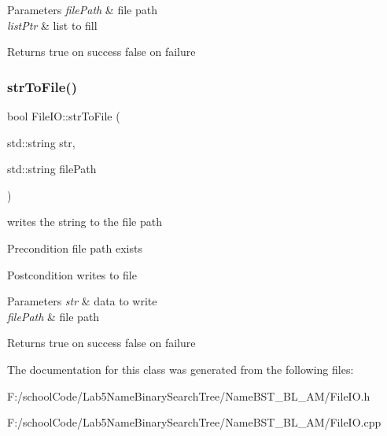 \begin{DoxyParams}{Parameters}
{\em file\+Path} & file path \\
\hline
{\em list\+Ptr} & list to fill \\
\hline
\end{DoxyParams}
\begin{DoxyReturn}{Returns}
true on success false on failure 
\end{DoxyReturn}
\mbox{\label{class_file_i_o_ac3a2546c33e52aab6f4b9376d5c41d5e}} 
\subsubsection{\texorpdfstring{str\+To\+File()}{strToFile()}}
{\footnotesize\ttfamily bool File\+I\+O\+::str\+To\+File (\begin{DoxyParamCaption}\item[{std\+::string}]{str,  }\item[{std\+::string}]{file\+Path }\end{DoxyParamCaption})\hspace{0.3cm}{\ttfamily [static]}}

writes the string to the file path \begin{DoxyPrecond}{Precondition}
file path exists 
\end{DoxyPrecond}
\begin{DoxyPostcond}{Postcondition}
writes to file 
\end{DoxyPostcond}

\begin{DoxyParams}{Parameters}
{\em str} & data to write \\
\hline
{\em file\+Path} & file path \\
\hline
\end{DoxyParams}
\begin{DoxyReturn}{Returns}
true on success false on failure 
\end{DoxyReturn}


The documentation for this class was generated from the following files\+:\begin{DoxyCompactItemize}
\item 
F\+:/school\+Code/\+Lab5\+Name\+Binary\+Search\+Tree/\+Name\+B\+S\+T\+\_\+\+B\+L\+\_\+\+A\+M/File\+I\+O.\+h\item 
F\+:/school\+Code/\+Lab5\+Name\+Binary\+Search\+Tree/\+Name\+B\+S\+T\+\_\+\+B\+L\+\_\+\+A\+M/File\+I\+O.\+cpp\end{DoxyCompactItemize}

